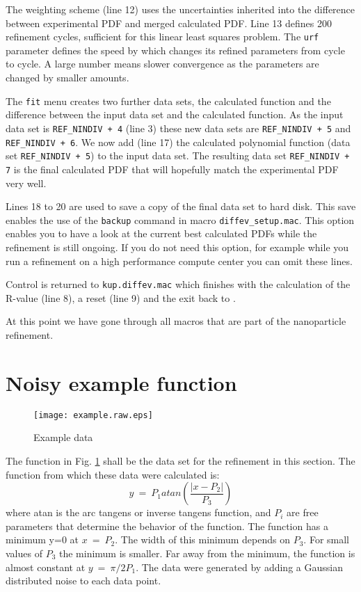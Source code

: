 The weighting scheme (line 12) uses the uncertainties inherited into the 
difference between experimental PDF and merged calculated PDF. Line 13
defines 200 refinement cycles, sufficient for this linear least squares 
problem. The {\tt urf} parameter defines the speed by which \Kuplot 
changes its refined parameters from cycle to cycle. A large number means slower
convergence as the parameters are changed by smaller amounts.

The {\tt fit} menu creates two further data sets, the calculated function
and the difference between the input data set and the calculated function.
As the input data set is {\tt REF\_NINDIV + 4} (line 3) these new data sets are
{\tt REF\_NINDIV + 5}  and {\tt REF\_NINDIV + 6}. We now add (line 17) 
the calculated polynomial function (data set {\tt REF\_NINDIV + 5}) 
to the input data set. The resulting data set {\tt REF\_NINDIV + 7} 
is the final calculated PDF that will hopefully match the experimental
PDF very well.

Lines 18 to 20 are used to save a copy of the final data set to hard disk.
This save enables the use of the {\tt backup} command in 
macro {\tt diffev\_setup.mac}. This option enables you to have a look 
at the current best calculated PDFs while the refinement is still ongoing.
If you do not need this option, for example while you run a refinement
on a high performance compute center you can omit these lines.

Control is returned to {\tt kup.diffev.mac} which finishes with the
calculation of the R-value (line 8), a reset (line 9) and the exit 
back to \Discus.

At this point we have gone through all macros that are part of the 
nanoparticle refinement.





\section{Noisy example function}

\begin{figure}
   \texttt{[image: example.raw.eps]}
   \caption{Example data}
   \label{fexa-arc}
\end{figure}

The function in Fig. \ref{fexa-arc} shall be the data set for the
refinement in this section. The function from which these data were
calculated is:
\begin{equation}
   y ~=~ P_{1} atan \left ( \frac{|x-P_{2}|}{P_{3}}\right)
   \label{eq-exa-arc}
\end{equation}
where atan is the arc tangens or inverse tangens function, and $P_{i}$
are free parameters that determine the behavior of the function. The
function has a minimum y=0 at $x ~=~ P_{2}$. The width of this minimum
depends on $P_{3}$. For small values of $P_{3}$ the minimum is smaller.
Far away from the minimum, the function is almost constant at 
$y ~=~ \pi/2 P_{1}$. The data were generated by adding a Gaussian 
distributed noise to each data point.

